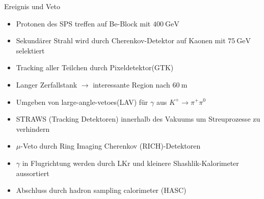 \documentclass[aspectratio=1610, professionalfonts, 9pt, t]{beamer}
\begin{document}
  \begin{frame}{Ereignis und Veto}
    \begin{itemize}
      \item Protonen des SPS treffen auf Be-Block mit $\SI{400}{\giga\electronvolt}$
      \item Sekundärer Strahl wird durch Cherenkov-Detektor auf Kaonen mit $\SI{75}{\giga\electronvolt}$ selektiert
      \item[\rightarrow] Tracking aller Teilchen durch Pixeldetektor(GTK)%
      \item Langer Zerfallstank $\rightarrow$ interessante Region nach $\SI{60}{\metre}$
      \item[\rightarrow] Umgeben von large-angle-vetoes(LAV) für $\gamma$ aus $K^+ \rightarrow \pi^+ \pi^0$
      \item STRAWS (Tracking Detektoren) innerhalb des Vakuums um Streuprozesse zu verhindern %
      \item $\mu$-Veto durch Ring Imaging Cherenkov (RICH)-Detektoren
      \item $\gamma$ in Flugrichtung werden durch LKr und kleinere Shashlik-Kalorimeter aussortiert
      \item Abschluss durch hadron sampling calorimeter (HASC)
    \end{itemize}
  \end{frame}
\end{document}
